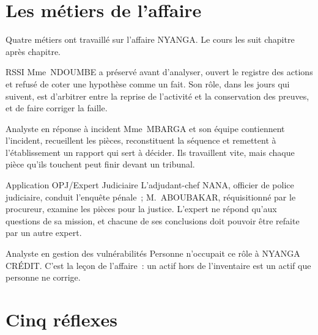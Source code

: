 \section{Les métiers de l'affaire}
\label{sec:p00-metiers}

Quatre métiers ont travaillé sur l'affaire NYANGA. Le cours les suit
chapitre après chapitre.

\begin{boxmetier}{RSSI}
Mme~NDOUMBE a préservé avant d'analyser, ouvert le registre des actions et
refusé de coter une hypothèse comme un fait. Son rôle, dans les jours qui
suivent, est d'arbitrer entre la reprise de l'activité et la conservation
des preuves, et de faire corriger la faille.
\end{boxmetier}

\begin{boxmetier}{Analyste en réponse à incident}
Mme~MBARGA et son équipe contiennent l'incident, recueillent les pièces,
reconstituent la séquence et remettent à l'établissement un rapport qui
sert à décider. Ils travaillent vite, mais chaque pièce qu'ils touchent
peut finir devant un tribunal.
\end{boxmetier}

\begin{boxmetier}{Application OPJ/Expert Judiciaire}
L'adjudant-chef NANA, officier de police judiciaire, conduit l'enquête
pénale~; M.~ABOUBAKAR, réquisitionné par le procureur, examine les pièces
pour la justice. L'expert ne répond qu'aux questions de sa mission, et
chacune de ses conclusions doit pouvoir être refaite par un autre expert.
\end{boxmetier}

\begin{boxmetier}{Analyste en gestion des vulnérabilités}
Personne n'occupait ce rôle à NYANGA CRÉDIT. C'est la leçon de l'affaire~:
un actif hors de l'inventaire est un actif que personne ne corrige.
\end{boxmetier}

\section{Cinq réflexes}
\label{sec:p00-reflexes}


